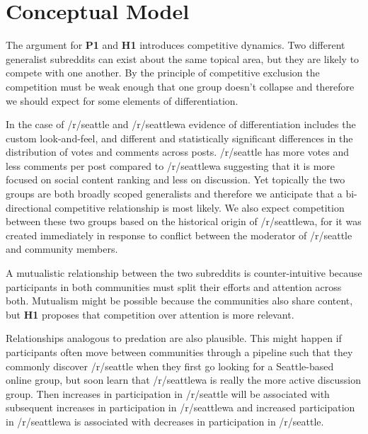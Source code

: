 \documentclass[12pt]{memoir}
\begin{document}
\section{Conceptual Model}

\label{sec:conc-modeld}

The argument for \textbf{P1} and \textbf{H1} introduces competitive dynamics.  Two different generalist subreddits can exist about the same topical area, but they are likely to compete with one another.  By the principle of competitive exclusion the competition must be weak enough that one group doesn't collapse and therefore we should expect for some elements of differentiation.


\begin{table}[h]

\end{table}

In the case of /r/seattle and /r/seattlewa evidence of differentiation includes the custom look-and-feel, and different and statistically significant differences in the distribution of votes and comments across posts. /r/seattle has more votes and less comments per post compared to /r/seattlewa suggesting that it is more focused on social content ranking and less on discussion. Yet topically the two groups are both broadly scoped generalists and therefore we anticipate that a bi-directional competitive relationship is most likely.  We also expect competition between these two groups based on the historical origin of /r/seattlewa, for it was created immediately in response to conflict between the moderator of /r/seattle and community members.



A mutualistic relationship between the two subreddits is counter-intuitive because participants in both communities must split their efforts and attention across both. Mutualism might be possible because the communities also share content, but \textbf{H1} proposes that competition over attention is more relevant. 

Relationships analogous to predation are also plausible. This might happen if participants often move between communities through a pipeline such that they commonly discover /r/seattle when they first go looking for a Seattle-based online group, but soon learn that /r/seattlewa is really the more active discussion group.   Then increases in participation in /r/seattle will be associated with subsequent increases in participation in /r/seattlewa and increased participation in /r/seattlewa  is associated with decreases in participation in /r/seattle.
\end{document}
